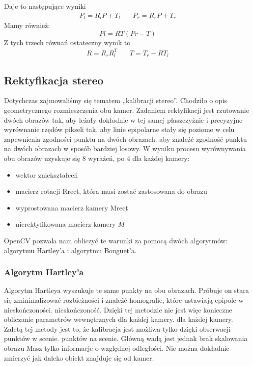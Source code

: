 \documentclass[magisterska]{pracadypl}
\begin{document}
Daje to następujące wyniki
\[
\begin{array}{cc}
P_l = R_l P + T_l & \quad P_r = R_r P + T_r
\end{array}
\]
Mamy również:
\[Pl=RT(Pr-T)\]
Z tych trzech równań ostateczny wynik to
\[
\begin{array}{cc}
R = R_r R_l^T & \quad T = T_r - R T_l
\end{array}
\]




\subsection{Rektyfikacja stereo}

Dotychczas zajmowaliśmy się tematem „kalibracji stereo”. Chodziło o
opis geometrycznego rozmieszczenia obu kamer. Zadaniem
rektyfikacji jest rzutowanie dwóch obrazów tak, aby leżały dokładnie w tej samej płaszczyźnie i precyzyjne wyrównanie rzędów pikseli tak, aby linie epipolarne stały się poziome w celu zapewnienia zgodności punktu na dwóch obrazach.
aby znaleźć zgodność punktu na dwóch obrazach w sposób bardziej losowy.
W wyniku procesu wyrównywania obu obrazów uzyskuje się 8 wyrażeń, po 4 dla każdej kamery:

\begin{itemize}
  \item wektor zniekształceń
  \item macierz rotacji Rrect, która musi zostać zastosowana do obrazu
  \item wyprostowana macierz kamery Mrect
  \item nierektyfikowana macierz kamery $M$
\end{itemize}

OpenCV pozwala nam obliczyć te warunki za pomocą dwóch algorytmów: algorytmu Hartley'a
i algorytmu Bouguet'a.

\subsubsection{Algorytm Hartley'a}

Algorytm Hartleya wyszukuje te same punkty na obu obrazach. Próbuje on
stara się zminimalizować rozbieżności i znaleźć homografie, które ustawiają epipole w nieskończoności.
nieskończoność. Dzięki tej metodzie nie jest więc konieczne obliczanie parametrów wewnętrznych dla każdej kamery.
dla każdej kamery.
Zaletą tej metody jest to, że kalibracja jest możliwa tylko dzięki obserwacji punktów w scenie.
punktów na scenie. Główną wadą jest jednak brak skalowania obrazu
Masz tylko informacje o względnej odległości. Nie można dokładnie zmierzyć
jak daleko obiekt znajduje się od kamer.
\end{document}
